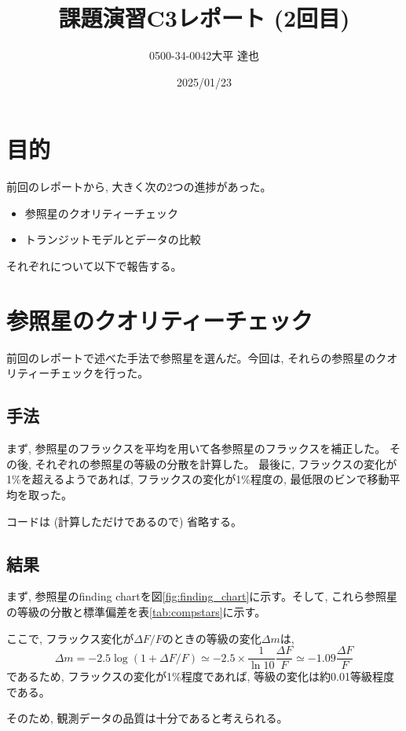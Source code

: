 \documentclass[dvipdfmx,a4paper]{jsarticle}
\begin{document}
\title{課題演習C3\quad レポート (2回目) }
\author{0500-34-0042\quad 大平 達也}
\date{2025/01/23}
\maketitle

\section{目的}
前回のレポートから, 大きく次の2つの進捗があった。
\begin{itemize}
  \item 参照星のクオリティーチェック
  \item トランジットモデルとデータの比較
\end{itemize}
それぞれについて以下で報告する。

\section{参照星のクオリティーチェック}
前回のレポートで述べた手法で参照星を選んだ。今回は, それらの参照星のクオリティーチェックを行った。
\subsection{手法}
まず, 参照星のフラックスを平均を用いて各参照星のフラックスを補正した。
その後, それぞれの参照星の等級の分散を計算した。
最後に, フラックスの変化が1\%を超えるようであれば, フラックスの変化が1\%程度の, 最低限のビンで移動平均を取った。

コードは (計算しただけであるので) 省略する。

\subsection{結果}
まず, 参照星のfinding chartを図\ref{fig:finding_chart}に示す。そして, これら参照星の等級の分散と標準偏差を表\ref{tab:compstars}に示す。

ここで, フラックス変化が$\Delta F/F$のときの等級の変化$\Delta m$は, 
$$\Delta m= -2.5\log(1+\Delta F/F)\simeq -2.5\times \dfrac{1}{\ln 10}\dfrac{\Delta F}{F}\simeq -1.09\dfrac{\Delta F}{F}$$
であるため, フラックスの変化が1\%程度であれば, 等級の変化は約0.01等級程度である。

そのため, 観測データの品質は十分であると考えられる。
\end{document}
